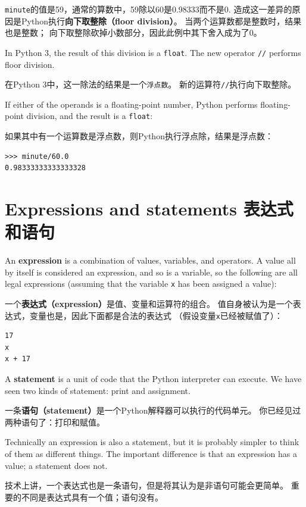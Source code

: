 \documentclass[10pt]{book}
\begin{document}
\begin{CJK}{UTF8}{gbsn}
{\tt minute}的值是59，通常的算数中，59除以60是0.98333而不是0.
造成这一差异的原因是Python执行{\bf 向下取整除（floor division）}。
当两个运算数都是整数时，结果也是整数；
向下取整除砍掉小数部分，因此此例中其下舍入成为了0。

In Python 3, the result of this division is a {\tt float}.  The new operator
{\tt //} performs floor division.

在Python 3中，这一除法的结果是一个{\tt 浮点数}。
新的运算符{\tt //}执行向下取整除。

If either of the operands is a floating-point number, Python performs
floating-point division, and the result is a {\tt float}:

如果其中有一个运算数是浮点数，则Python执行浮点除，结果是浮点数：

\begin{verbatim}
>>> minute/60.0
0.98333333333333328
\end{verbatim}


\section{Expressions and statements 表达式和语句}

An {\bf expression} is a combination of values, variables, and operators.
A value all by itself is considered an expression, and so is
a variable, so the following are all legal expressions
(assuming that the variable {\tt x} has been assigned a value):

一个{\bf 表达式（expression）}是值、变量和运算符的组合。
值自身被认为是一个表达式，变量也是，因此下面都是合法的表达式
（假设变量{\tt x}已经被赋值了）：

\begin{verbatim}
17
x
x + 17
\end{verbatim}
%
A {\bf statement} is a unit of code that the Python interpreter can
execute.  We have seen two kinds of statement: print and
assignment.

一条{\bf 语句（statement）}是一个Python解释器可以执行的代码单元。
你已经见过两种语句了：打印和赋值。

Technically an expression is also a statement, but it is probably
simpler to think of them as different things.  The important difference
is that an expression has a value; a statement does not.

技术上讲，一个表达式也是一条语句，但是将其认为是非语句可能会更简单。
重要的不同是表达式具有一个值；语句没有。


\end{CJK}
\end{document}
